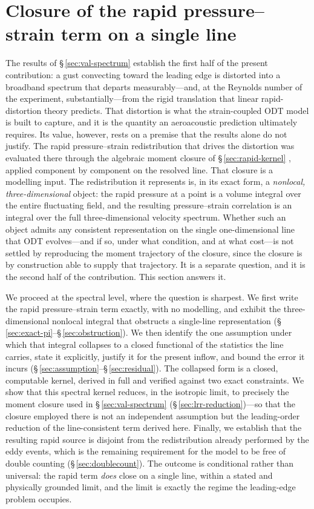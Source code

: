\documentclass[lineno]{JFM-FLM_Au}
\newcounter{assumption}
\begin{document}
\section{Closure of the rapid pressure--strain term on a single line}
\label{sec:gate}

The results of \S\,\ref{sec:val-spectrum} establish the first half of the
present contribution: a gust convecting toward the leading edge is distorted
into a broadband spectrum that departs measurably---and, at the Reynolds number
of the experiment, substantially---from the rigid translation that linear
rapid-distortion theory predicts. That distortion is what the strain-coupled
ODT model is built to capture, and it is the quantity an aeroacoustic
prediction ultimately requires. Its value, however, rests on a premise that the
results alone do not justify. The rapid pressure--strain redistribution that
drives the distortion was evaluated there through the algebraic moment closure of \S\,\ref{sec:rapid-kernel}
\citep{LaunderReeceRodi1975}, applied component by component on the resolved
line. That closure is a modelling input. The redistribution it represents is,
in its exact form, a \emph{nonlocal, three-dimensional} object: the rapid
pressure at a point is a volume integral over the entire fluctuating field, and
the resulting pressure--strain correlation is an integral over the full
three-dimensional velocity spectrum. Whether such an object admits any
consistent representation on the single one-dimensional line that ODT
evolves---and if so, under what condition, and at what cost---is not settled by
reproducing the moment trajectory of the closure, since the closure is by
construction able to supply that trajectory. It is a separate question, and it
is the second half of the contribution. This section answers it.

We proceed at the spectral level, where the question is sharpest. We first
write the rapid pressure--strain term exactly, with no modelling, and exhibit
the three-dimensional nonlocal integral that obstructs a single-line
representation (\S\,\ref{sec:exact-pi}--\S\,\ref{sec:obstruction}). We then
identify the one assumption under which that integral collapses to a closed
functional of the statistics the line carries, state it explicitly, justify it
for the present inflow, and bound the error it incurs
(\S\,\ref{sec:assumption}--\S\,\ref{sec:residual}). The collapsed form is a
closed, computable kernel, derived in full and verified against two exact
constraints. We show that this spectral kernel reduces, in the isotropic limit,
to precisely the moment closure used in \S\,\ref{sec:val-spectrum}
(\S\,\ref{sec:lrr-reduction})---so that the closure employed there is not an
independent assumption but the leading-order reduction of the line-consistent
term derived here. Finally, we establish that the resulting rapid source is
disjoint from the redistribution already performed by the eddy events, which is
the remaining requirement for the model to be free of double counting
(\S\,\ref{sec:doublecount}). The outcome is conditional rather than universal:
the rapid term \emph{does} close on a single line, within a stated and
physically grounded limit, and the limit is exactly the regime the
leading-edge problem occupies.
\end{document}
